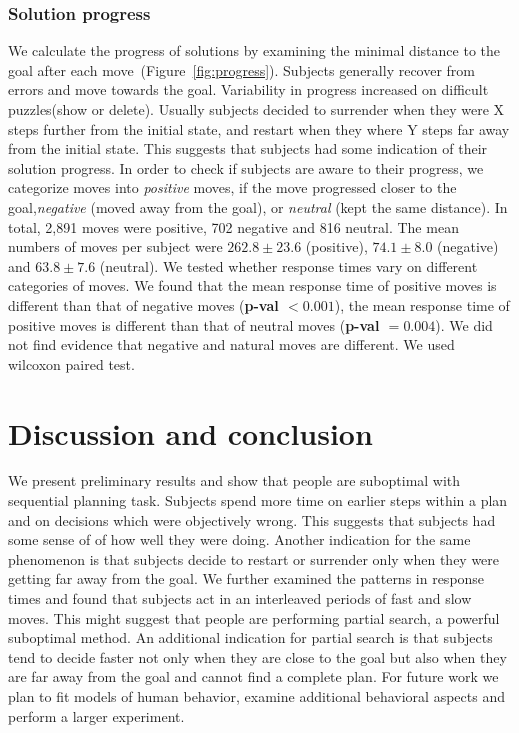 \documentclass[10pt,letterpaper]{article}
\begin{document}
\subsubsection{Solution progress}
We calculate the progress of solutions by examining the minimal distance to the goal after each move~(Figure~\ref{fig:progress}). Subjects generally recover from errors and move towards the goal. Variability in progress increased on difficult puzzles(show or delete). Usually subjects decided to surrender when they were X steps further from the initial state, and restart when they where Y steps far away from the initial state. This suggests that subjects had some indication of their solution progress. In order to check if subjects are aware to their progress, we categorize moves into \emph{positive} moves, if the move progressed closer to the goal,\emph{negative} (moved away from the goal), or \emph{neutral} (kept the same distance). In total, 2,891 moves were positive, 702 negative and 816 neutral. The mean numbers of moves per subject were $262.8 \pm 23.6$ (positive), $74.1 \pm 8.0$ (negative) and $63.8 \pm 7.6$ (neutral).
We tested whether response times vary on different categories of moves. We found that the mean response time of positive moves is different than that of negative moves ({\bf p-val $< 0.001$}), the mean response time of positive moves is different than that of neutral moves ({\bf p-val $= 0.004$}). We did not find evidence that negative and natural moves are different.
We used wilcoxon paired test.

\vspace{-0.3cm}
\section{Discussion and conclusion}
\vspace{-0.15cm}
We present preliminary results and show that people are suboptimal with sequential planning task. Subjects spend more time on earlier steps within a plan and on decisions which were objectively wrong. This suggests that subjects had some sense of of how well they were doing. Another indication for the same phenomenon is that subjects decide to restart or surrender only when they were getting far away from the goal.  We further examined the patterns in response times and found that subjects act in an interleaved periods of fast and slow moves. This might suggest that people are performing partial search, a powerful suboptimal method. An additional indication for partial search is that subjects tend to decide faster not only when they are close to the goal but also when they are far away from the goal and cannot find a complete plan. For future work we plan to fit models of human behavior, examine additional behavioral aspects and perform a larger experiment.
\end{document}
